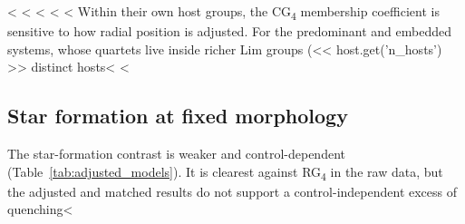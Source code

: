 \documentclass{aa}
\newcommand{\CG}{CG\textsubscript{4}}
\newcommand{\RG}{RG\textsubscript{4}}
\begin{document}
<%
<%
<%
<%
<%
Within their own host groups, the \CG{} membership coefficient is sensitive to how radial position is adjusted. For the \nGrPre{} predominant and \nGrEmb{} embedded systems, whose quartets live inside richer Lim groups (<< host.get('n_hosts') >> distinct hosts<%
<%

\subsection{Star formation at fixed morphology}\label{sec:star_formation}

The star-formation contrast is weaker and control-dependent (Table~\ref{tab:adjusted_models}). It is clearest against \RG{} in the raw data, but the adjusted and matched results do not support a control-independent excess of quenching<%
\end{document}
